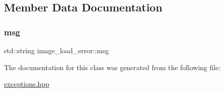 \subsection{Member Data Documentation}
\mbox{\label{classimage__load__error_a250134697d7e52db38453039ad59c7df}} 
\subsubsection{\texorpdfstring{msg}{msg}}
{\footnotesize\ttfamily std\+::string image\+\_\+load\+\_\+error\+::msg\hspace{0.3cm}{\ttfamily [private]}}



The documentation for this class was generated from the following file\+:\begin{DoxyCompactItemize}
\item 
\hyperlink{exceptions_8hpp}{exceptions.\+hpp}\end{DoxyCompactItemize}
